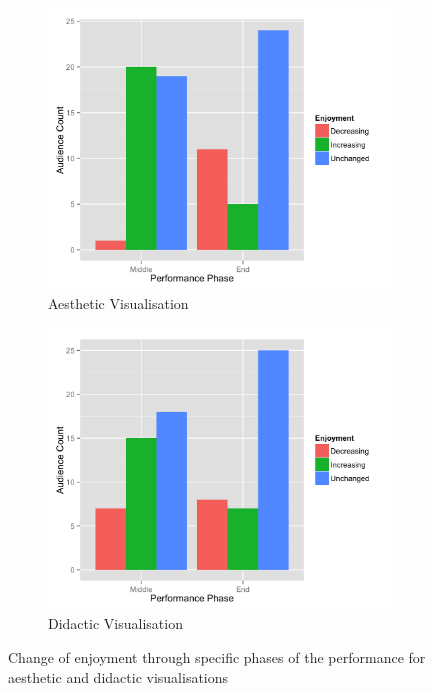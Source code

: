 \documentclass{article}
\begin{document}
\begin{figure}[t]
\centering
\begin{subfigure}{.5\textwidth}
    \centering
    \includegraphics[width=1.0\linewidth]{graphs/enjoyment-change-aesthetic.png}
    \caption{Aesthetic Visualisation}
    \label{aestheticenjoymentchange}
\end{subfigure}%
\begin{subfigure}{.5\textwidth}
    \centering
    \includegraphics[width=1.0\linewidth]{graphs/enjoyment-change-didactic.png}
    \caption{Didactic Visualisation}
    \label{didacticenjoymentchange}
\end{subfigure}
\caption{Change of enjoyment through specific phases of the performance for aesthetic and didactic visualisations}
\end{figure}
\end{document}
